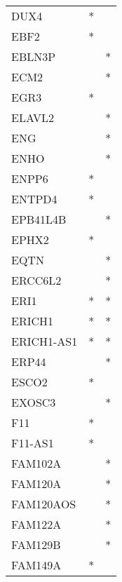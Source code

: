 \begin{longtable}{lcc}
DUX4                  &              * &            \\
EBF2                  &              * &            \\
EBLN3P                &                &          * \\
ECM2                  &                &          * \\
EGR3                  &              * &            \\
ELAVL2                &                &          * \\
ENG                   &                &          * \\
ENHO                  &                &          * \\
ENPP6                 &              * &            \\
ENTPD4                &              * &            \\
EPB41L4B              &                &          * \\
EPHX2                 &              * &            \\
EQTN                  &                &          * \\
ERCC6L2               &                &          * \\
ERI1                  &              * &          * \\
ERICH1                &              * &          * \\
ERICH1-AS1            &              * &          * \\
ERP44                 &                &          * \\
ESCO2                 &              * &            \\
EXOSC3                &                &          * \\
F11                   &              * &            \\
F11-AS1               &              * &            \\
FAM102A               &                &          * \\
FAM120A               &                &          * \\
FAM120AOS             &                &          * \\
FAM122A               &                &          * \\
FAM129B               &                &          * \\
FAM149A               &              * &            \\

\end{longtable}
